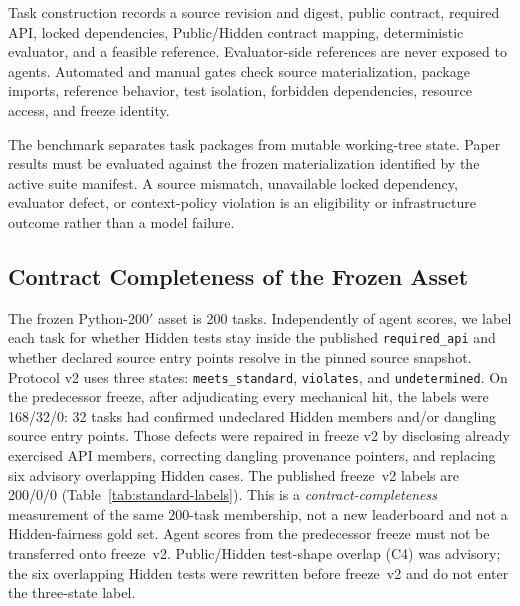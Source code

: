 Task construction records a source revision and digest, public contract,
required API, locked dependencies, Public/Hidden contract mapping,
deterministic evaluator, and a feasible reference. Evaluator-side references
are never exposed to agents. Automated and manual gates check source
materialization, package imports, reference behavior, test isolation,
forbidden dependencies, resource access, and freeze identity.

The benchmark separates task packages from mutable working-tree state. Paper
results must be evaluated against the frozen materialization identified by the
active suite manifest. A source mismatch, unavailable locked dependency,
evaluator defect, or context-policy violation is an eligibility or
infrastructure outcome rather than a model failure.

\subsection{Contract Completeness of the Frozen Asset}
\label{sec:standard-subset}

The frozen Python-200$'$ asset is 200 tasks. Independently of agent scores, we
label each task for whether Hidden tests stay inside the published
\texttt{required\_api} and whether declared source entry points resolve in the
pinned source snapshot. Protocol v2 uses three states:
\texttt{meets\_standard}, \texttt{violates}, and \texttt{undetermined}. On the
predecessor freeze, after adjudicating every mechanical hit, the labels were
168/32/0: 32 tasks had confirmed undeclared Hidden members and/or dangling
source entry points. Those defects were repaired in freeze v2 by disclosing
already exercised API members, correcting dangling provenance pointers, and
replacing six advisory overlapping Hidden cases. The published freeze~v2
labels are 200/0/0 (Table~\ref{tab:standard-labels}). This is a
\emph{contract-completeness} measurement of the same 200-task membership, not a
new leaderboard and not a Hidden-fairness gold set. Agent scores from the
predecessor freeze must not be transferred onto freeze~v2. Public/Hidden
test-shape overlap (C4) was advisory; the six overlapping Hidden tests were
rewritten before freeze~v2 and do not enter the three-state label.

\begin{table}[t]
  \caption{Freeze~v2 contract-completeness labels on the 200-task paper suite.
  Predecessor freeze labels were 168/32/0. Not a Functional Pass table.}
  \label{tab:standard-labels}
  \centering
  
\end{table}

